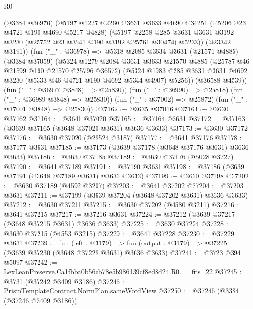 \begin{lexlean}{R0}
\begin{coremodule}
            (@3384 @36976)
            (@5197
              @1227
              @2260
              @3631
              @3633
              @4690
              @34251
              (@5206 @23 @4721 @190 @4690 @5217 @4828)
              (@5197
                @2258
                @285
                @3631
                @3631
                @3192
                @3230
                (@25752 @23 @3241 @190 @3192 @25761 @30474)
                @5233))
            (@23342 @3191))
          (fun ("_" : @36978) =>
          @5318
            @2085
            @3634
            @3631
            (@21571 @4885)
            (@3384 @37059)
            (@5324
              @1279
              @2084
              @3631
              @3633
              @21570
              @4885
              (@25787 @46 @21599 @190 @21570 @25796 @36572)
              (@5324
                @1983
                @285
                @3631
                @3631
                @4692
                @3230
                (@5333 @46 @4721 @190 @4692 @5344 @4907)
                @5256))
            (@36588 @4539))
          (fun ("_" : @36977 @3848) => @25830))
        (fun ("_" : @36990) => @25818)
        (fun ("_" : @36989 @3848) => @25830))
      (fun ("_" : @37002) => @25872)
      (fun ("_" : @37001 @3848) => @25830))
@37162 := @3635 @37016
@37163 := @3630 @37162
@37164 := @3641 @37020
@37165 := @37164 @3631
@37172 := @37163 (@3639 @37165 (@3648 @37020 @3631) @3636 @3633)
@37173 := @3630 @37172
@37176 := @3630 @37020 (@28524 @3187)
@37177 := @3641 @37176
@37178 := @37177 @3631
@37185 := @37173 (@3639 @37178 (@3648 @37176 @3631) @3636 @3633)
@37186 := @3630 @37185
@37189 := @3630 @37176 (@5028 @3227)
@37190 := @3641 @37189
@37191 := @37190 @3631
@37198 := @37186 (@3639 @37191 (@3648 @37189 @3631) @3636 @3633)
@37199 := @3630 @37198
@37202 := @3630 @37189 (@4592 @3207)
@37203 := @3641 @37202
@37204 := @37203 @3631
@37211 := @37199 (@3639 @37204 (@3648 @37202 @3631) @3636 @3633)
@37212 := @3630 @37211
@37215 := @3630 @37202 (@4580 @3211)
@37216 := @3641 @37215
@37217 := @37216 @3631
@37224 := @37212 (@3639 @37217 (@3648 @37215 @3631) @3636 @3633)
@37225 := @3630 @37224
@37228 := @3630 @37215 (@4553 @3215)
@37229 := @3641 @37228
@37230 := @37229 @3631
@37239 := fun (left : @3179) =>
  fun (output : @3179) => @37225 (@3639 @37230 (@3648 @37228 @3631) @3636 @3633)
@37241 := @3723 @394 @5097
@37242 := LexLeanPreserve.Ca1fbba0b56cb78e5b986139cf8ed8d24.R0.__fits_22
@37245 := @3731 (@37242 @3409 @3186)
@37246 := PrismTemplateContract.NormPlan.sameWordView
@37250 := @37245 (@3384 (@37246 @3409 @3186))

\end{coremodule}
\end{lexlean}
